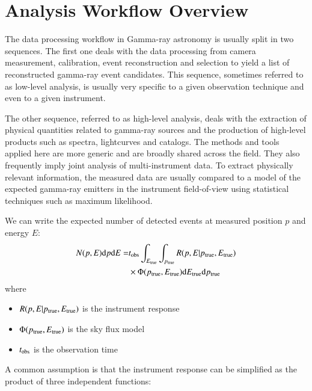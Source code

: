 \section{Analysis Workflow Overview}
\label{sec:analysis-workflow-overview}

The data processing workflow in Gamma-ray astronomy is usually split in two sequences.
The first one deals with the data processing from camera measurement, calibration, event
reconstruction and selection to yield a list of reconstructed gamma-ray event candidates.
This sequence, sometimes referred to as low-level analysis, is usually very specific to
a given observation technique and even to a given instrument.

The other sequence, referred to as high-level analysis, deals with the extraction of physical
quantities related to gamma-ray sources and the production of high-level products such as spectra,
lightcurves and catalogs. The methods and tools applied here are more generic and are broadly
shared across the field. They also frequently imply joint analysis of multi-instrument data.
To extract physically relevant information, the measured data are usually compared to a
model of the expected gamma-ray emitters in the instrument field-of-view using statistical
techniques such as maximum likelihood.

We can write the expected number of detected events at measured position $p$ and energy $E$:
\begin{align}
   N(p, E) {\rm d}p {\rm d}E = &t_{\rm obs} \int_{E_{\rm true}} \int_{p_{\rm true}}  R(p, E|p_{\rm true}, E_{\rm true})\\
   &\times \Phi(p_{\rm true}, E_{\rm true}) {\rm d}E_{\rm true} {\rm d}p_{\rm true}
\end{align}
where
\begin{itemize}
\item $R(p, E| p_{\rm true}, E_{\rm true})$ is the instrument response
\item $\Phi(p_{\rm true}, E_{\rm true})$ is the sky flux model
\item $t_{\rm obs}$ is the observation time
\end{itemize}

A common assumption is that the instrument response can be simplified as the product
of three independent functions:

